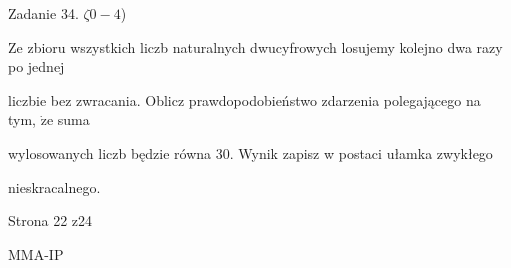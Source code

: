 \documentclass[a4paper,12pt]{article}
\begin{document}
Zadanie 34. $\zeta 0-4$)

Ze zbioru wszystkich liczb naturalnych dwucyfrowych losujemy kolejno dwa razy po jednej

liczbie bez zwracania. Oblicz prawdopodobieństwo zdarzenia polegającego na tym, $\dot{\mathrm{z}}\mathrm{e}$ suma

wylosowanych liczb będzie równa 30. Wynik zapisz w postaci ułamka zwykłego

nieskracalnego.

Strona 22 z24

MMA-IP
\end{document}
